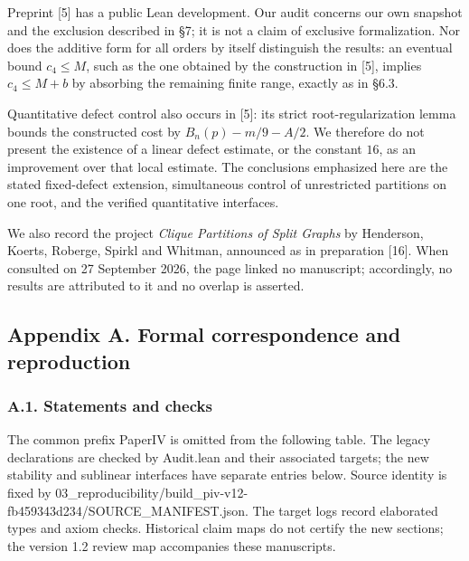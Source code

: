 \documentclass[english,11pt,a4paper]{article}
\begin{document}
Preprint {[}5{]} has a public Lean development. Our audit concerns our own snapshot and the exclusion described in §7; it is not a claim of exclusive formalization. Nor does the additive form for all orders by itself distinguish the results: an eventual bound \(c_4\le M\), such as the one obtained by the construction in {[}5{]}, implies \(c_4\le M+b\) by absorbing the remaining finite range, exactly as in §6.3.

Quantitative defect control also occurs in {[}5{]}: its strict root-regularization lemma bounds the constructed cost by \(B_n(p)-m/9-A/2\). We therefore do not present the existence of a linear defect estimate, or the constant \(16\), as an improvement over that local estimate. The conclusions emphasized here are the stated fixed-defect extension, simultaneous control of unrestricted partitions on one root, and the verified quantitative interfaces.

We also record the project \emph{Clique Partitions of Split Graphs} by Henderson, Koerts, Roberge, Spirkl and Whitman, announced as in preparation {[}16{]}. When consulted on 27 September 2026, the page linked no manuscript; accordingly, no results are attributed to it and no overlap is asserted.

\subsection{Appendix A. Formal correspondence and reproduction}\label{appendix-a.-formal-correspondence-and-reproduction}

\subsubsection{A.1. Statements and checks}\label{a.1.-statements-and-checks}

The common prefix {\ttfamily\small PaperIV} is omitted from the following table. The legacy declarations are checked by {\ttfamily\small Audit.\discretionary{\hbox{\ensuremath{\hookrightarrow}}}{}{}lean} and their associated targets; the new stability and sublinear interfaces have separate entries below. Source identity is fixed by {\ttfamily\small 03\_\discretionary{\hbox{\ensuremath{\hookrightarrow}}}{}{}reproducibil\discretionary{\hbox{\ensuremath{\hookrightarrow}}}{}{}ity/\discretionary{\hbox{\ensuremath{\hookrightarrow}}}{}{}build\_\discretionary{\hbox{\ensuremath{\hookrightarrow}}}{}{}piv-\discretionary{\hbox{\ensuremath{\hookrightarrow}}}{}{}v12-\discretionary{\hbox{\ensuremath{\hookrightarrow}}}{}{}fb459343d234\discretionary{\hbox{\ensuremath{\hookrightarrow}}}{}{}/\discretionary{\hbox{\ensuremath{\hookrightarrow}}}{}{}SOURCE\_\discretionary{\hbox{\ensuremath{\hookrightarrow}}}{}{}MANIFEST.\discretionary{\hbox{\ensuremath{\hookrightarrow}}}{}{}json}. The target logs record elaborated types and axiom checks. Historical claim maps do not certify the new sections; the version 1.2 review map accompanies these manuscripts.
\end{document}
